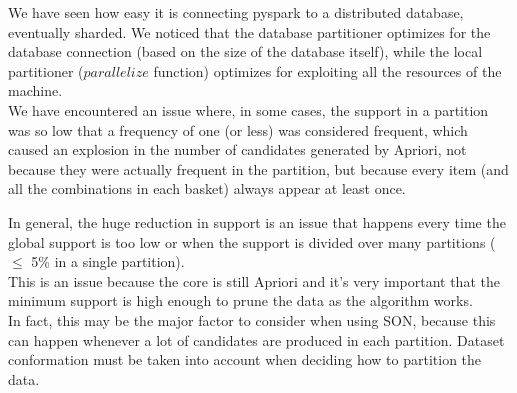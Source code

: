 \documentclass[a4paper]{article}
\begin{document}
	We have seen how easy it is connecting pyspark to a distributed database, eventually sharded.	
	We noticed that the database partitioner optimizes for the database connection (based on the size of the database itself), 
	while the local partitioner ($parallelize$ function) optimizes for exploiting all the resources of the machine.\\
	
	We have encountered an issue where, in some cases, the support in a partition was so low that a frequency of one (or less) was considered frequent, 
	which caused an explosion in the number of candidates generated by Apriori, not because they were actually frequent in the partition, but 
	because every item (and all the combinations in each basket) always appear at least once. 

	In general, the huge reduction in support is an issue that happens every time the global support is too low or when the support is divided over many partitions ($\leq$ 5\% in a single partition).\\
	This is an issue because the core is still Apriori and it's very important that the minimum support is high enough to prune the data as the algorithm works.\\

	In fact, this may be the major factor to consider when using SON, because this can happen whenever a lot of candidates are produced in each partition.
	Dataset conformation must be taken into account when deciding how to partition the data.\\

	
		
\end{document}
